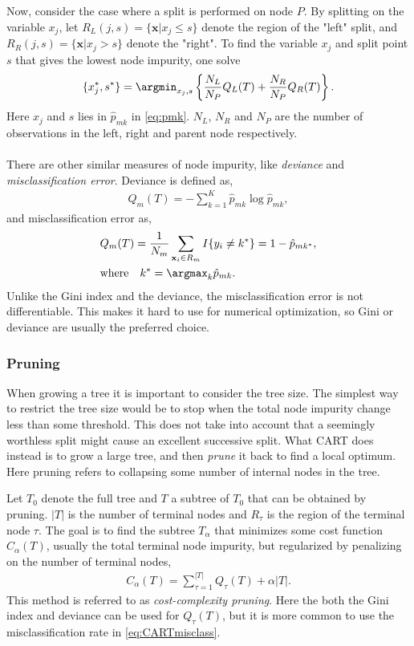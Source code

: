 Now, consider the case where a split is performed on node $P$. By splitting on the variable $x_j$, let $R_L(j,s) = \{\mathbf{x} | x_j \leq s\}$ denote the region of the "left" split,  and $R_R(j,s) = \{\mathbf{x} | x_j > s\}$ denote the "right". To find the variable $x_j$ and split point $s$ that gives the lowest node impurity, one solve
\begin{align}
  \{x_j^*, s^*\} = \argmin_{x_j,s} \left\{ \frac{N_L}{N_P} Q_L(T)
  + \frac{N_R}{N_P} Q_R(T) \right\}.
\end{align}
Here $x_j$ and $s$ lies in $\hat{p}_{mk}$ in \eqref{eq:pmk}. $N_L$, $N_R$ and $N_P$ are the number of observations in the left, right and parent node respectively.
\\
\\
There are other similar measures of node impurity, like \textit{deviance} and \textit{misclassification error}. Deviance is defined as,
\begin{align}
  Q_m(T) = -  \sum^{K}_{k=1} \hat p_{m k} \log \hat p_{m k},
\end{align}
and misclassification error as,
\begin{align}
  \label{eq:CARTmisclass} 
  &Q_m(T) = \frac{1}{N_m} \sum_{\mathbf{x}_i \in R_m} I\{y_i \neq k^*\} = 1 - \hat p_{m k^*},\\
  &\text{where} \quad k^* = \argmax_k \hat p_{m k}. \notag
\end{align}
Unlike the Gini index and the deviance, the misclassification error is not differentiable. This makes it hard to use for numerical optimization, so Gini or deviance are usually the preferred choice. 

\subsubsection{Pruning}
\label{sub:Pruning}

When growing a tree it is important to consider the tree size. The simplest way to restrict the tree size would be to stop when the total node impurity change less than some threshold. This does not take into account that a seemingly worthless split might cause an excellent successive split. 
What CART does instead is to grow a large tree, and then \textit{prune} it back to find a local optimum. Here pruning refers to collapsing some number of internal nodes in the tree. 

Let $T_0$ denote the full tree and $T$ a subtree of $T_0$ that can be obtained by pruning. $|T|$ is the number of terminal nodes and $R_{\tau}$ is the region of the terminal node $\tau$. The goal is to find the subtree $T_\alpha$ that minimizes some cost function $C_\alpha (T)$, usually the total terminal node impurity, but regularized by penalizing on the number of terminal nodes,
\begin{align}
  \label{eq:CostPruning} 
  C_\alpha (T) = \sum_{\tau = 1}^{|T|} Q_\tau (T) + \alpha |T|. 
\end{align}
This method is referred to as \textit{cost-complexity pruning}.
Here the both the Gini index and deviance can be used for $Q_\tau (T)$, but it is more common to use the misclassification rate in \eqref{eq:CARTmisclass}. 

